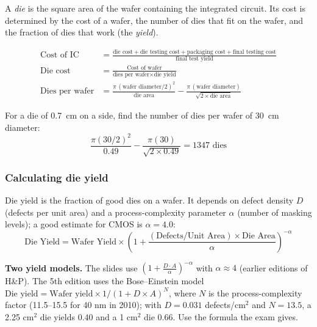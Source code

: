 \begin{definition}[Die]
A \emph{die} is the square area of the wafer containing the integrated
circuit. Its cost is determined by the cost of a wafer, the number of dies
that fit on the wafer, and the fraction of dies that work (the
\emph{yield}).
\end{definition}

\begin{prop}
\begin{align*}
  \text{Cost of IC} &= \frac{\text{die cost} + \text{die testing cost} +
  \text{packaging cost} + \text{final testing cost}}{\text{final test yield}} \\[4pt]
  \text{Die cost} &= \frac{\text{Cost of wafer}}{\text{dies per wafer} \times
  \text{die yield}} \\[4pt]
  \text{Dies per wafer} &= \frac{\pi\,(\text{wafer diameter}/2)^2}{\text{die
  area}} - \frac{\pi\,(\text{wafer diameter})}{\sqrt{2 \times \text{die
  area}}}
\end{align*}
\end{prop}

\begin{eg}
For a die of 0.7~cm on a side, find the number of dies per wafer of 30~cm
diameter:
\[
  \frac{\pi (30/2)^2}{0.49} - \frac{\pi (30)}{\sqrt{2\times 0.49}} = 1347
  \text{ dies}
\]
\end{eg}

\subsubsection{Calculating die yield}
\begin{prop}
Die yield is the fraction of good dies on a wafer. It depends on defect
density $D$ (defects per unit area) and a process-complexity parameter
$\alpha$ (number of masking levels); a good estimate for CMOS is $\alpha
=4.0$:
\[
  \text{Die Yield} = \text{Wafer Yield} \times \left(1 +
  \frac{(\text{Defects/Unit Area}) \times \text{Die Area}}{\alpha}
  \right)^{-\alpha}
\]
\end{prop}
\begin{remark}
\textbf{Two yield models.} The slides use $\left(1+\frac{D\cdot A}{\alpha}\right)^{-\alpha}$
with $\alpha\approx4$ (earlier editions of H\&P). The 5th edition uses the
Bose--Einstein model $\text{Die yield}=\text{Wafer yield}\times1/(1+D\times A)^N$,
where $N$ is the process-complexity factor (11.5--15.5 for 40 nm in 2010); with
$D=0.031$ defects/cm$^2$ and $N=13.5$, a 2.25 cm$^2$ die yields 0.40 and a
1 cm$^2$ die 0.66. Use the formula the exam gives.
\end{remark}

